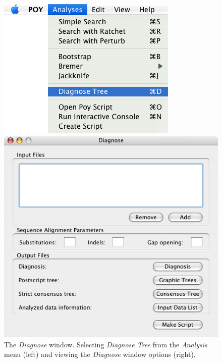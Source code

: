 \begin{figure}
\centering
\begin{minipage}[c]{0.48\textwidth}
   		\includegraphics[width=\textwidth]{doc/figures/diagnose_menu.jpg}
\end{minipage}
\quad
\begin{minipage}[c]{0.48\textwidth}
	   	\includegraphics[width=\textwidth]{doc/figures/diagnose_window.jpg}
   	\end{minipage}
\caption{The \emph{Diagnose} window. Selecting \emph{Diagnose Tree} from the \emph{Analysis} menu (left) and viewing the \emph{Diagnose} window options (right).}
\label{fig:diagnosetree}
\end{figure}

